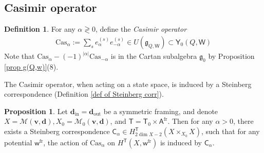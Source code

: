 \documentclass[10pt]{amsart}
\theoremstyle{definition}
\newtheorem{Proposition}[Theorem]{Proposition}
\newtheorem{Definition}[Theorem]{Definition}
\numberwithin{equation}{section}
\newcommand{\bv}{\mathbf{v}}
\newcommand{\bd}{\mathbf{d}}
\newcommand{\cM}{\mathcal{M}}
\newcommand{\sA}{\mathsf{A}}
\newcommand{\sT}{\mathsf{T}}
\newcommand{\sW}{\mathsf{W}}
\newcommand{\sw}{\mathsf{w}}
\newcommand{\In}{\operatorname{in}}
\newcommand{\Out}{\operatorname{out}}
\begin{document}
\subsection{Casimir operator}


\begin{Definition}\label{def of Casimir}
For any $\alpha\gtrless 0$, define the \textit{Casimir operator}
\begin{align*}
    \mathrm{Cas}_\alpha:=\sum_{s}e^{(s)}_\alpha e^{(s)}_{-\alpha}\in U(\mathfrak{g}_{Q,\sW})\subset \mathsf Y_0(Q,\sW)
\end{align*}
Note that $\mathrm{Cas}_\alpha-(-1)^{|\alpha|}\mathrm{Cas}_{-\alpha}$ is in the Cartan subalgebra $\mathfrak{g}_0$ by Proposition \ref{prop g(Q,w)}(8).
\end{Definition}

The Casimir operator, when acting on a state space, is induced by a Steinberg correspondence (Definition \ref{def of Steinberg corr}).

\begin{Proposition}\label{prop Casimir}
Let $\bd_{\In} =\bd_{\Out}$ be a symmetric framing, and denote $X=\cM(\bv,{\bd}), X_0=\cM_0(\bv,{\bd})$, and $\sT=\sT_0\times \sA^{\mathrm{fr}}$. Then for any $\alpha>0$, there exists a Steinberg correspondence $\mathsf C_\alpha\in H^{\sT}_{2\dim X-2}(X\times_{X_0} X)$, such that for any potential $\sw^{\mathrm{fr}}$, the action of $\mathrm{Cas}_\alpha$ on $H^\sT(X,\sw^{\mathrm{fr}})$ is induced by $\mathsf C_\alpha$.
\end{Proposition}
\end{document}
